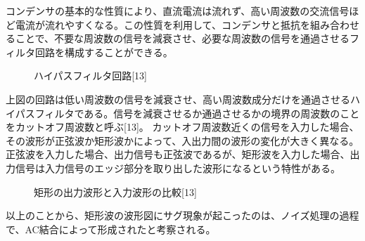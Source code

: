 \documentclass{article}
\begin{document}
\begin{spacing}{1.2}
    コンデンサの基本的な性質により、直流電流は流れず、高い周波数の交流信号ほど電流が流れやすくなる。この性質を利用して、コンデンサと抵抗を組み合わせることで、不要な周波数の信号を減衰させ、必要な周波数の信号を通過させるフィルタ回路を構成することができる。
    \begin{figure}[ht] %
        \centering
        \caption{ハイパスフィルタ回路[13]}
    \end{figure}
    \FloatBarrier
    上図の回路は低い周波数の信号を減衰させ、高い周波数成分だけを通過させるハイパスフィルタである。信号を減衰させるか通過させるかの境界の周波数のことをカットオフ周波数と呼ぶ[13]。
    カットオフ周波数近くの信号を入力した場合、その波形が正弦波か矩形波かによって、入出力間の波形の変化が大きく異なる。正弦波を入力した場合、出力信号も正弦波であるが、矩形波を入力した場合、出力信号は入力信号のエッジ部分を取り出した波形になるという特性がある。
    \begin{figure}[ht] %
        \centering
        \caption{矩形の出力波形と入力波形の比較[13]}
    \end{figure}
    \FloatBarrier
    以上のことから、矩形波の波形図にサグ現象が起こったのは、ノイズ処理の過程で、AC結合によって形成されたと考察される。
\end{spacing}

\newpage
\end{document}
